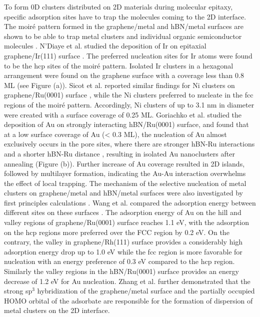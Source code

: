 To form 0D clusters distributed on 2D materials during molecular
epitaxy, specific adsorption sites have to trap the molecules coming
to the 2D interface. The moiré pattern formed in the graphene/metal
and hBN/metal surfaces are shown to be able to trap metal clusters
\cite{Goriachko_2007_assembl_hBN_ru,Goriachko_2008_AuNP_moire_hBN,Pan_2009_Pt_cluster_gr,Zhou_2010_metal_cluster_gr_Ru,Sicot_2010_Ni_cluster_gr_Ru,Wang_2011_gr_hBN_metal_cl,Zhang_2014_metal_gr_Ru}
and individual organic semiconductor molecules
\cite{Joshi_2014_TCNQ_hBN,Dil_2008_hBN_Rh,Lu_2012_c60_gr_moire,Roos_2011_hiera_org_gr,Roos_2011_BTP_gr}.
N’Diaye et al. studied the deposition of Ir on epitaxial
graphene/Ir(111) surface \cite{N_Diaye_2006_Ir_gr_Ir}. The preferred
nucleation sites for Ir atoms were found to be the hcp sites of the
moiré pattern. Isolated Ir clusters in a hexagonal arrangement were
found on the graphene surface with a coverage less than 0.8 ML (see
Figure (a)). Sicot et al. reported similar findings for Ni
clusters on graphene/Ru(0001) surface
\cite{Sicot_2010_Ni_cluster_gr_Ru}, while the Ni clusters preferred to
nucleate in the fcc regions of the moiré pattern. Accordingly, Ni
clusters of up to 3.1 nm in diameter were created with a surface
coverage of 0.25 ML.  Goriachko et al. studied the deposition of Au on
strongly interacting hBN/Ru(0001) surface, and found that at a low
surface coverage of Au (< 0.3 ML), the nucleation of Au almost
exclusively occurs in the pore sites, where there are stronger hBN-Ru
interactions and a shorter hBN-Ru distance
\cite{Goriachko_2007_assembl_hBN_ru,Goriachko_2008_AuNP_moire_hBN},
resulting in isolated Au nanoclusters after annealing (Figure
(b)). Further increase of Au coverage resulted in 2D
islands, followed by multilayer formation, indicating the Au-Au
interaction overwhelms the effect of local trapping. The mechanism of
the selective nucleation of metal clusters on graphene/metal and
hBN/metal surfaces were also investigated by first principles
calculations
\cite{Wang_2011_gr_hBN_metal_cl,Zhang_2014_metal_gr_Ru}. Wang et
al. compared the adsorption energy between different sites on these
surfaces \cite{Wang_2011_gr_hBN_metal_cl}. The adsorption energy of Au
on the hill and valley regions of graphene/Ru(0001) surface reaches
1.1 eV, with the adsorption on the hcp regions more preferred over the
FCC region by 0.2 eV. On the contrary, the valley in graphene/Rh(111)
surface provides a considerably high adsorption energy drop up to 1.0
eV while the fcc region is more favorable for nucleation with an
energy preference of 0.3 eV compared to the hcp region. Similarly the
valley regions in the hBN/Ru(0001) surface provides an energy
decrease of 1.2 eV for Au nucleation. Zhang et al. further
demonstrated that the strong sp\(^{\text{3}}\) hybridization of the
graphene/metal surface and the partially occupied HOMO orbital of the
adsorbate are responsible for the formation of dispersion of metal
clusters on the 2D interface.


